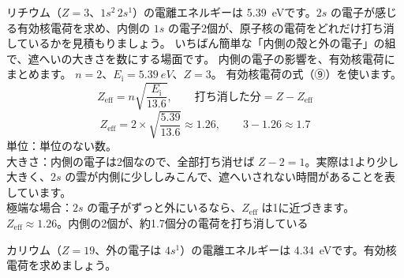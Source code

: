 \label{ph:原-7:ex5}
\begin{phreidai}
リチウム（$Z=3$、$1s^2\,2s^1$）の電離エネルギーは \qty{5.39}{eV}です。$2s$ の電子が感じる有効核電荷を求め、内側の $1s$ の電子2個が、原子核の電荷をどれだけ打ち消しているかを見積もりましょう。
\phbamen
いちばん簡単な「内側の殻と外の電子」の組で、遮へいの大きさを数にする場面です。
\phmushi
内側の電子の影響を、有効核電荷にまとめます。
\phzu
$n=2$、$E_{\mathrm i}=\qty{5.39}{eV}$、$Z=3$。
\phriyu
有効核電荷の式（⑨）を使います。
\phtateru
\[ Z_{\mathrm{eff}}=n\sqrt{\frac{E_{\mathrm i}}{13.6}},\qquad \text{打ち消した分}=Z-Z_{\mathrm{eff}} \]
\phtoku
\[ Z_{\mathrm{eff}}=2\times\sqrt{\frac{5.39}{13.6}}\approx1.26,\qquad 3-1.26\approx1.7 \]
\phtashikame
単位：単位のない数。\\
大きさ：内側の電子は2個なので、全部打ち消せば $Z-2=1$。実際は1より少し大きく、$2s$ の雲が内側に少ししみこんで、遮へいされない時間があることを表しています。\\
極端な場合：$2s$ の電子がずっと外にいるなら、$Z_{\mathrm{eff}}$ は1に近づきます。
\kotae $Z_{\mathrm{eff}}\approx1.26$。内側の2個が、約1.7個分の電荷を打ち消している
\end{phreidai}
\begin{jibun}
カリウム（$Z=19$、外の電子は $4s^1$）の電離エネルギーは \qty{4.34}{eV}です。有効核電荷を求めましょう。
\end{jibun}

